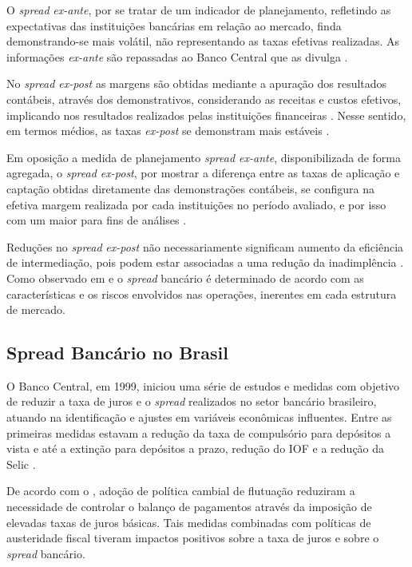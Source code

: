 \documentclass[
  12pt,
  12pt,
  openright,
  oneside,
  a4paper,
  chapter=TITLE,
  section=TITLE,
  subsection=TITLE,
  subsubsection=TITLE,
  english,
  portugues,
  sumario=tradicional]{abntex2}
\begin{document}
O \emph{spread} \emph{ex-ante}, por se tratar de um indicador de planejamento, refletindo as expectativas das instituições bancárias em relação ao mercado, finda demonstrando-se mais volátil, não representando as taxas efetivas realizadas. As informações \emph{ex-ante} são repassadas ao Banco Central que as divulga \cite{durigan:2018, leal:2006, dantas:2012}.

No \emph{spread ex-post} as margens são obtidas mediante a apuração dos resultados contábeis, através dos demonstrativos, considerando as receitas e custos efetivos, implicando nos resultados realizados pelas instituições financeiras \cite{kunt:1999, durigan:2018}. Nesse sentido, em termos médios, as taxas \emph{ex-post} se demonstram mais estáveis \cite{leal:2006, dantas:2012}.

Em oposição a medida de planejamento \emph{spread ex-ante}, disponibilizada de forma agregada, o \emph{spread ex-post}, por mostrar a diferença entre as taxas de aplicação e captação obtidas diretamente das demonstrações contábeis, se configura na efetiva margem realizada por cada instituições no período avaliado, e por isso com um maior para fins de análises \cite{dantas:2012}.

Reduções no \emph{spread} \emph{ex-post} não necessariamente significam aumento da
eficiência de intermediação, pois podem estar associadas a uma
redução da inadimplência \cite{kunt:1999}. Como observado em
\textcite{klein:1971} e \textcite{ho-saunders:1981} o \emph{spread} bancário é
determinado de acordo com as características e os riscos envolvidos nas
operações, inerentes em cada estrutura de mercado.

\subsection{Spread Bancário no Brasil}

O Banco Central, em 1999, iniciou uma série de estudos e medidas com objetivo de reduzir a taxa de juros e o \emph{spread} realizados no setor bancário brasileiro, atuando na identificação e ajustes em variáveis econômicas influentes. Entre as primeiras medidas estavam a redução da taxa de compulsório para depósitos a vista e até a extinção para depósitos a prazo, redução do IOF e a redução da Selic \cite{BCB:2000}.

De acordo com o \textcite{BCB:1999}, adoção de política cambial de flutuação reduziram a necessidade de controlar o balanço de pagamentos através da imposição de elevadas taxas de juros básicas. Tais medidas combinadas com políticas de austeridade fiscal tiveram impactos positivos sobre a taxa de juros e sobre o \emph{spread} bancário.
\end{document}
